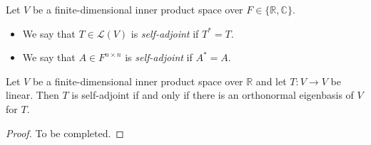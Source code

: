 \begin{definition}
  Let $V$ be a finite-dimensional inner product space over
  $F \in \{\mathbb{R}, \mathbb{C}\}$.
  \begin{itemize}
    \item We say that $T \in \mathcal{L}(V)$ is \emph{self-adjoint} if
    $T^* = T$.
    \item We say that $A \in F^{n \times n}$ is \emph{self-adjoint} if
    $A^* = A$.
  \end{itemize}
\end{definition}

\begin{theorem}
  Let $V$ be a finite-dimensional inner product space over $\mathbb{R}$ and let
  $T: V \to V$ be linear.
  Then $T$ is self-adjoint if and only if there is an orthonormal eigenbasis of
  $V$ for $T$.
\end{theorem}
\begin{proof}
  To be completed.
\end{proof}